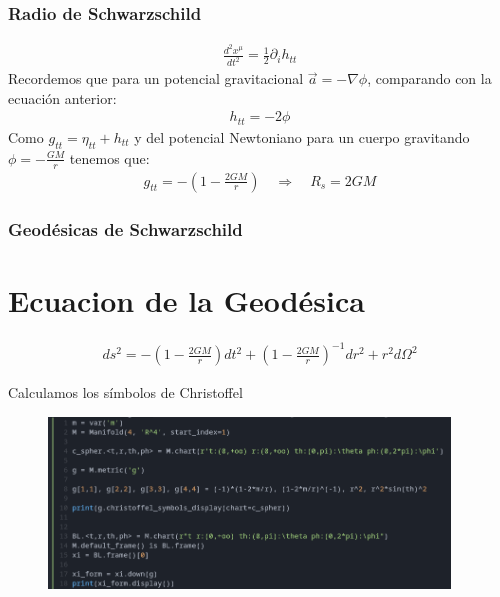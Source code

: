 \documentclass{beamer}
\begin{document}


\begin{frame}
\frametitle{Radio de Schwarzschild}
\begin{gather*}
\frac{d ^2 x ^ {\mu} }{d t^2 } = \frac{1}{2} \partial _{i }  h _{tt }
\end{gather*}
Recordemos que para un potencial gravitacional $ \vec a = -\nabla  \phi $, comparando con la ecuación anterior: 
\begin{gather*}
  h _{tt } = -2\phi 
\end{gather*}
Como $ g _{tt } = \eta _{tt } + h _{tt }  $ y del potencial Newtoniano para un cuerpo gravitando $ \phi = - \frac{GM }{r } $ tenemos que: 
\begin{gather*}
  g _{tt } = - \left(1 - \frac{2GM }{r }\right) \quad \Longrightarrow \quad R_s = 2GM
\end{gather*}
\end{frame}




\begin{frame}
\frametitle{Geodésicas de Schwarzschild}
\section{Ecuacion de la Geodésica}

\begin{gather*}
  ds^2 = - \left(1 - \frac{2GM }{r }\right)dt^2 + \left(1 - \frac{2GM }{r}\right) ^ {-1 } dr^2 + r^2 d \Omega^2  
\end{gather*}

Calculamos los símbolos de Christoffel
\begin{figure}[H]
  \begin{center}
    \includegraphics[width=0.95\textwidth]{sage.png}
  \end{center}
\end{figure}
\end{frame}
\end{document}
